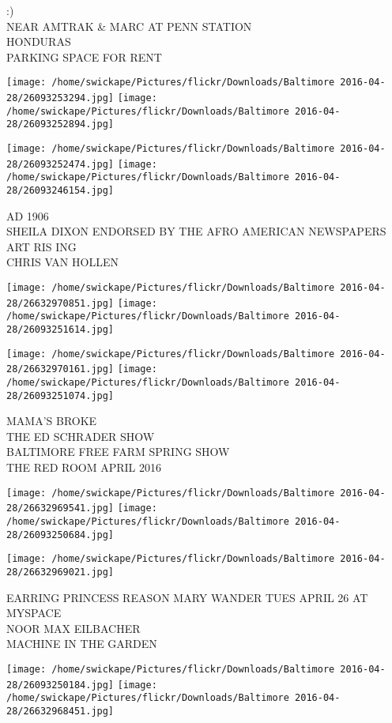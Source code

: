 \documentclass[10pt,letterpaper]{article}
\begin{document}
:)\\
NEAR AMTRAK \& MARC AT PENN STATION\\
HONDURAS\\
PARKING SPACE FOR RENT
\pagebreak

\texttt{[image: /home/swickape/Pictures/flickr/Downloads/Baltimore 2016-04-28/26093253294.jpg]}
\texttt{[image: /home/swickape/Pictures/flickr/Downloads/Baltimore 2016-04-28/26093252894.jpg]}

\texttt{[image: /home/swickape/Pictures/flickr/Downloads/Baltimore 2016-04-28/26093252474.jpg]}
\texttt{[image: /home/swickape/Pictures/flickr/Downloads/Baltimore 2016-04-28/26093246154.jpg]}

AD 1906\\
SHEILA DIXON ENDORSED BY THE AFRO AMERICAN NEWSPAPERS\\
ART RIS ING\\
CHRIS VAN HOLLEN
\pagebreak

\texttt{[image: /home/swickape/Pictures/flickr/Downloads/Baltimore 2016-04-28/26632970851.jpg]}
\texttt{[image: /home/swickape/Pictures/flickr/Downloads/Baltimore 2016-04-28/26093251614.jpg]}

\texttt{[image: /home/swickape/Pictures/flickr/Downloads/Baltimore 2016-04-28/26632970161.jpg]}
\texttt{[image: /home/swickape/Pictures/flickr/Downloads/Baltimore 2016-04-28/26093251074.jpg]}

MAMA'S BROKE\\
THE ED SCHRADER SHOW\\
BALTIMORE FREE FARM SPRING SHOW\\
THE RED ROOM APRIL 2016
\pagebreak

\texttt{[image: /home/swickape/Pictures/flickr/Downloads/Baltimore 2016-04-28/26632969541.jpg]}
\texttt{[image: /home/swickape/Pictures/flickr/Downloads/Baltimore 2016-04-28/26093250684.jpg]}

\vspace{0.25in}
\texttt{[image: /home/swickape/Pictures/flickr/Downloads/Baltimore 2016-04-28/26632969021.jpg]}

EARRING PRINCESS REASON MARY WANDER TUES APRIL 26 AT MYSPACE\\
NOOR MAX EILBACHER\\
MACHINE IN THE GARDEN
\pagebreak

\texttt{[image: /home/swickape/Pictures/flickr/Downloads/Baltimore 2016-04-28/26093250184.jpg]}
\texttt{[image: /home/swickape/Pictures/flickr/Downloads/Baltimore 2016-04-28/26632968451.jpg]}
\end{document}

